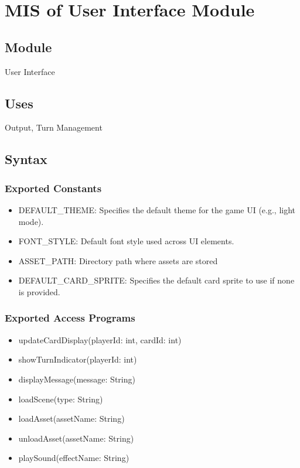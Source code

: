 \documentclass[12pt, titlepage]{article}
\begin{document}
\section{MIS of User Interface Module} 

\subsection{Module}
\hspace{1.5em}User Interface

\subsection{Uses}
\hspace{1.5em}Output, Turn Management

\subsection{Syntax}

\subsubsection{Exported Constants}
\begin{itemize}
\item DEFAULT\_THEME: Specifies the default theme for the game UI (e.g., light mode).
\item FONT\_STYLE: Default font style used across UI elements.
\item ASSET\_PATH: Directory path where assets are stored
\item DEFAULT\_CARD\_SPRITE: Specifies the default card sprite to use if none is provided.

\end{itemize}

\subsubsection{Exported Access Programs}

\begin{itemize}
\item updateCardDisplay(playerId: int, cardId: int)
\item showTurnIndicator(playerId: int)
\item displayMessage(message: String)
\item loadScene(type: String)
\item loadAsset(assetName: String)
\item unloadAsset(assetName: String)
\item playSound(effectName: String)
\end{itemize}
\end{document}

